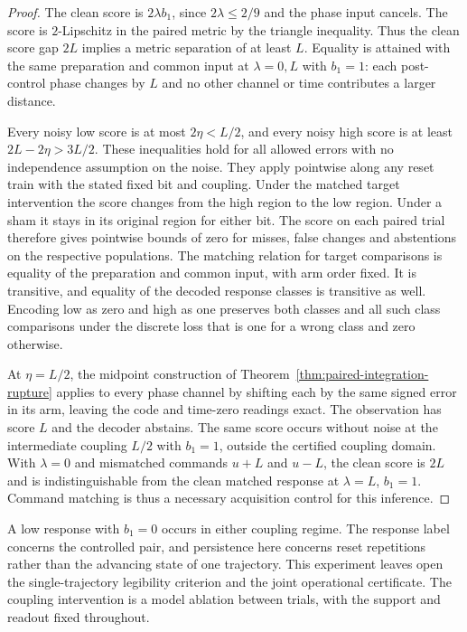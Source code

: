 \documentclass[11pt,a4paper]{article}
\theoremstyle{definition}
\begin{document}
\begin{proof}
The clean score is $2\lambda b_1$, since $2\lambda\le2/9$ and the phase input cancels. The score is $2$-Lipschitz in the paired metric by the triangle inequality. Thus the clean score gap $2L$ implies a metric separation of at least $L$. Equality is attained with the same preparation and common input at $\lambda=0,L$ with $b_1=1$: each post-control phase changes by $L$ and no other channel or time contributes a larger distance.

Every noisy low score is at most $2\eta<L/2$, and every noisy high score is at least $2L-2\eta>3L/2$. These inequalities hold for all allowed errors with no independence assumption on the noise. They apply pointwise along any reset train with the stated fixed bit and coupling. Under the matched target intervention the score changes from the high region to the low region. Under a sham it stays in its original region for either bit. The score on each paired trial therefore gives pointwise bounds of zero for misses, false changes and abstentions on the respective populations. The matching relation for target comparisons is equality of the preparation and common input, with arm order fixed. It is transitive, and equality of the decoded response classes is transitive as well. Encoding low as zero and high as one preserves both classes and all such class comparisons under the discrete loss that is one for a wrong class and zero otherwise.

At $\eta=L/2$, the midpoint construction of Theorem~\ref{thm:paired-integration-rupture} applies to every phase channel by shifting each by the same signed error in its arm, leaving the code and time-zero readings exact. The observation has score $L$ and the decoder abstains. The same score occurs without noise at the intermediate coupling $L/2$ with $b_1=1$, outside the certified coupling domain. With $\lambda=0$ and mismatched commands $u+L$ and $u-L$, the clean score is $2L$ and is indistinguishable from the clean matched response at $\lambda=L$, $b_1=1$. Command matching is thus a necessary acquisition control for this inference.
\end{proof}

A low response with $b_1=0$ occurs in either coupling regime. The response label concerns the controlled pair, and persistence here concerns reset repetitions rather than the advancing state of one trajectory. This experiment leaves open the single-trajectory legibility criterion and the joint operational certificate. The coupling intervention is a model ablation between trials, with the support and readout fixed throughout.
\end{document}
